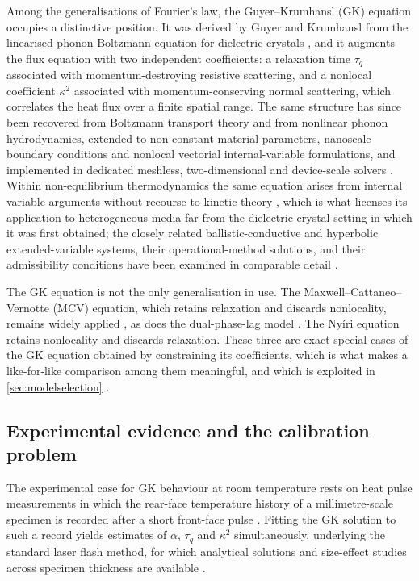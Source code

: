 \documentclass[preprint,12pt,a4paper]{elsarticle}
\theoremstyle{plain}
\theoremstyle{definition}
\theoremstyle{remark}
\newcommand{\tq}{\tau_{q}}
\newcommand{\kk}{\kappa^{2}}
\begin{document}
Among the generalisations of Fourier's law, the Guyer--Krumhansl (GK)
equation occupies a distinctive position. It was derived by Guyer and
Krumhansl from the linearised phonon Boltzmann equation for dielectric
crystals \cite{GuyerKrumhansl1966a,GuyerKrumhansl1966b}, and it augments the
flux equation with two independent coefficients: a relaxation time $\tq$
associated with momentum-destroying resistive scattering, and a nonlocal
coefficient $\kk$ associated with momentum-conserving normal scattering,
which correlates the heat flux over a finite spatial range. The same
structure has since been recovered from Boltzmann transport theory and from
nonlinear phonon hydrodynamics, extended to non-constant material
parameters, nanoscale boundary conditions and nonlocal vectorial
internal-variable formulations, and implemented in dedicated meshless,
two-dimensional and device-scale solvers
\cite{Xu2024,DiDomenico2025,Restuccia2023,Kovacs2026}.
Within non-equilibrium thermodynamics the same equation arises from internal
variable arguments without recourse to kinetic theory
\cite{Van2001,Szucs2021}, which is what licenses its application to
heterogeneous media far from the dielectric-crystal setting in which it was
first obtained; the closely related ballistic-conductive and hyperbolic
extended-variable systems, their operational-method solutions, and their
admissibility conditions have been examined in comparable detail
\cite{Rukolaine2024,Zhukovsky2016a,Zhukovsky2016}.

The GK equation is not the only generalisation in use. The
Maxwell--Cattaneo--Vernotte (MCV) equation, which retains relaxation and
discards nonlocality, remains widely applied \cite{Maillet2019,Kovacs2020},
as does the dual-phase-lag model \cite{vanderMerwe2021}. The Nyíri equation
\cite{Nyiri1991} retains nonlocality and discards relaxation. These three are
exact special cases of the GK equation obtained by constraining its
coefficients, which is what makes a like-for-like comparison among them
meaningful, and which is exploited in \cref{sec:modelselection}
\cite{Zhang2024,Sobolev2025}.

\subsection{Experimental evidence and the calibration problem}

The experimental case for GK behaviour at room temperature rests on heat
pulse measurements in which the rear-face temperature history of a
millimetre-scale specimen is recorded after a short front-face pulse
\cite{Both2016,Van2017,Feher2021sizeeffects}. Fitting the GK solution to such
a record yields estimates of $\alpha$, $\tq$ and $\kk$ simultaneously,
underlying the standard laser flash method, for which analytical solutions
and size-effect studies across specimen thickness are available
\cite{Kovacs2018,Feher2021sizeeffects,FeherKovacs2021}.
\end{document}
